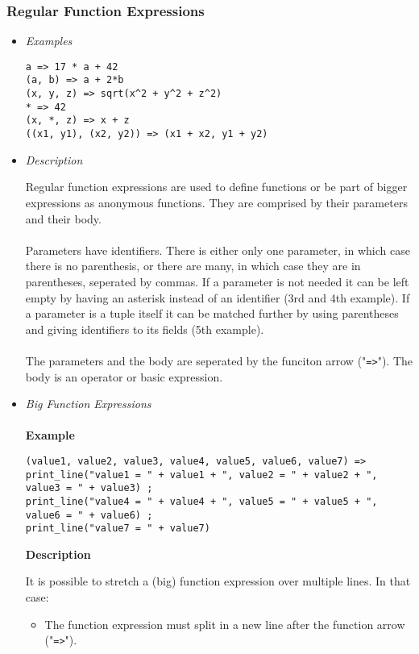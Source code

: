 \documentclass{article}
\begin{document}
\subsubsection{Regular Function Expressions}

\begin{itemize}
\item \textit{Examples}

\begin{verbatim}
a => 17 * a + 42
(a, b) => a + 2*b
(x, y, z) => sqrt(x^2 + y^2 + z^2)
* => 42
(x, *, z) => x + z
((x1, y1), (x2, y2)) => (x1 + x2, y1 + y2)
\end{verbatim}

\item \textit{Description}

Regular function expressions are used to define functions or be part of bigger
expressions as anonymous functions. They are comprised by their parameters and
their body.
\\\\
Parameters have identifiers. There is either only one parameter, in which case
there is no parenthesis, or there are many, in which case they are in
parentheses, seperated by commas. If a parameter is not needed it can be left
empty by having an asterisk instead of an identifier (3rd and 4th example).
If a parameter is a tuple itself it can be matched further by using parentheses
and giving identifiers to its fields (5th example).
\\\\
The parameters and the body are seperated by the funciton arrow
("\verb|=>|"). The body is an operator or basic expression.

\item \textit{Big Function Expressions}\\\\
\textbf{Example}

\begin{verbatim}
(value1, value2, value3, value4, value5, value6, value7) =>
print_line("value1 = " + value1 + ", value2 = " + value2 + ", value3 = " + value3) ;
print_line("value4 = " + value4 + ", value5 = " + value5 + ", value6 = " + value6) ;
print_line("value7 = " + value7)
\end{verbatim}

\textbf{Description}

It is possible to stretch a (big) function expression over multiple lines.
In that case:
\begin{itemize}
\item
The function expression must split in a new line after the function arrow
("\verb|=>|").


\end{itemize}
\end{itemize}
\end{document}
